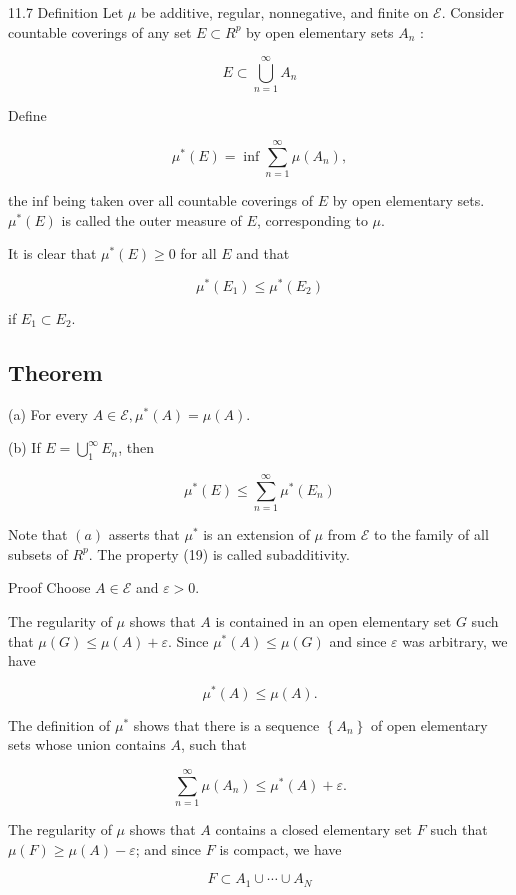 \documentclass[10pt]{article}
\begin{document}
11.7 Definition Let $\mu$ be additive, regular, nonnegative, and finite on $\mathscr{E}$. Consider countable coverings of any set $E \subset R^{p}$ by open elementary sets $A_{n}$ :

$$
E \subset \bigcup_{n=1}^{\infty} A_{n}
$$

Define

$$
\mu^{*}(E)=\inf \sum_{n=1}^{\infty} \mu\left(A_{n}\right),
$$

the inf being taken over all countable coverings of $E$ by open elementary sets. $\mu^{*}(E)$ is called the outer measure of $E$, corresponding to $\mu$.

It is clear that $\mu^{*}(E) \geq 0$ for all $E$ and that

$$
\mu^{*}\left(E_{1}\right) \leq \mu^{*}\left(E_{2}\right)
$$

if $E_{1} \subset E_{2}$.

\subsection{Theorem}
(a) For every $A \in \mathscr{E}, \mu^{*}(A)=\mu(A)$.

(b) If $E=\bigcup_{1}^{\infty} E_{n}$, then

$$
\mu^{*}(E) \leq \sum_{n=1}^{\infty} \mu^{*}\left(E_{n}\right)
$$

Note that $(a)$ asserts that $\mu^{*}$ is an extension of $\mu$ from $\mathscr{E}$ to the family of all subsets of $R^{p}$. The property (19) is called subadditivity.

Proof Choose $A \in \mathscr{E}$ and $\varepsilon>0$.

The regularity of $\mu$ shows that $A$ is contained in an open elementary set $G$ such that $\mu(G) \leq \mu(A)+\varepsilon$. Since $\mu^{*}(A) \leq \mu(G)$ and since $\varepsilon$ was arbitrary, we have

$$
\mu^{*}(A) \leq \mu(A) .
$$

The definition of $\mu^{*}$ shows that there is a sequence $\left\{A_{n}\right\}$ of open elementary sets whose union contains $A$, such that

$$
\sum_{n=1}^{\infty} \mu\left(A_{n}\right) \leq \mu^{*}(A)+\varepsilon .
$$

The regularity of $\mu$ shows that $A$ contains a closed elementary set $F$ such that $\mu(F) \geq \mu(A)-\varepsilon$; and since $F$ is compact, we have

$$
F \subset A_{1} \cup \cdots \cup A_{N}
$$
\end{document}
